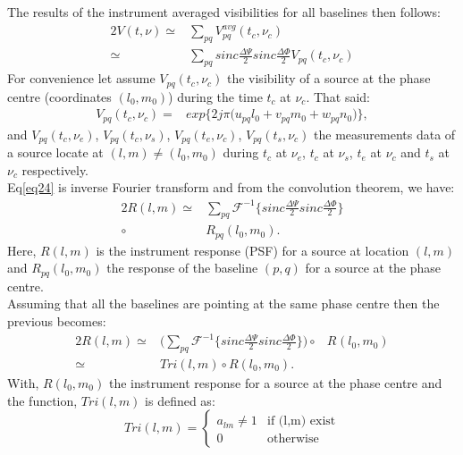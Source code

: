 The  results of the instrument averaged visibilities for all baselines then follows:
\begin{alignat}{2}
V(t,\nu)\simeq&\sum_{pq} V_{pq}^{avg}(t_c, \nu_c)\\
	\simeq&\sum_{pq} sinc\frac{\Delta \Psi}{2}sinc\frac{\Delta \Phi}{2} V_{pq}(t_{c},\nu_{c})\label{eq24}
\end{alignat}
For convenience let assume $V_{pq}(t_{c},\nu_{c})$ the visibility of a source at the phase centre (coordinates $(l_0,m_0)$) during the 
time $t_c$ at $\nu_c$. That said: 
\begin{eqnarray}
 V_{pq}(t_c, \nu_c)=& exp\bigg\{2j\pi\big(u_{pq}l_0+v_{pq}m_0+ w_{pq}n_0\big)\bigg\},
\end{eqnarray}
and $V_{pq}(t_{c},\nu_{e})$, $V_{pq}(t_{c},\nu_{s})$, $V_{pq}(t_{e},\nu_{c})$, $V_{pq}(t_{s},\nu_{c})$ the measurements data of a source 
locate at $(l,m)\neq(l_0,m_0)$ during $t_c$ at $\nu_e$, $t_c$ at $\nu_s$, $t_e$ at $\nu_c$ and  $t_s$ at $\nu_c$ respectively.\\
Eq\ref{eq24} is inverse Fourier transform and from the  convolution theorem, we have:
\begin{alignat}{2}
R(l,m)\simeq& \sum_{pq}\mathcal{F}^{-1}\bigg\{sinc\frac{\Delta \Psi}{2}sinc\frac{\Delta \Phi}{2}\bigg\}\\
	\circ& R_{pq}(l_0,m_0).
\end{alignat}
Here, $R(l,m)$ is the instrument response (PSF) for a source at location $(l,m)$ and $R_{pq}(l_0,m_0)$ the response of the baseline 
$(p,q)$ for a source at the phase centre.\\
Assuming that all the baselines are pointing at the same phase centre then the previous becomes:
\begin{alignat}{2}
R(l,m)\simeq&\bigg(\sum_{pq}\mathcal{F}^{-1}\bigg\{sinc\frac{\Delta \Psi}{2}sinc\frac{\Delta \Phi}{2}\bigg\}\bigg)
	\circ& R_{}(l_0,m_0)\\
      \simeq& Tri(l,m)\circ R(l_0,m_0).\label{eqtota}
\end{alignat}
With, $R(l_0,m_0)$ the instrument response for a source at the phase centre and the function, $Tri(l,m)$ is defined as:
\begin{equation*}
Tri(l,m)=\left\{
\begin{array}{rl}
a_{lm}\neq 1 & \mbox{if (l,m) exist} \\
0 & \mbox{otherwise}
\end{array}\right.
\end{equation*}
